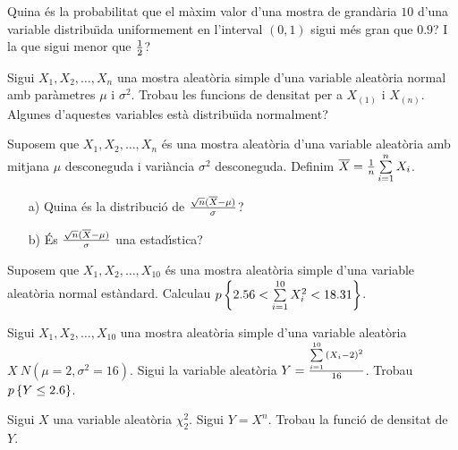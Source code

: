 \begin{prob}
{Quina \'es la probabilitat que el m\`axim valor 
d'una mostra de grand\`aria $10$ d'una variable distribu\"{\i}da uniformement 
en l'interval $(0,1)$
sigui m\'es gran que $0.9$? I la que sigui menor que ${1\over 2}$?}
\end{prob}

\begin{prob}
{Sigui $X_1,X_2,\ldots,X_n$ una mostra aleat\`oria simple d'una
variable aleat\`oria 
normal amb par\`ametres $\mu$ i $\sigma^2$. 
Trobau les funcions de densitat per a $X_{(1)}$ i $X_{(n)}$. 
Algunes d'aquestes variables est\`a distribu\"{\i}da normalment?}
\end{prob}

\begin{prob}
{Suposem que $X_1,X_2,\ldots,X_n$ \'es una mostra aleat\`oria d'una
variable aleat\`oria 
amb mitjana $\mu$ desconeguda i vari\`ancia $\sigma^2$ desconeguda. 
Definim \break $\overline{X}={1\over n}\sum\limits_{i=1}^n X_i$.
\begin{itemize}
\item[a)] {Quina \'es la distribuci\'o de ${\sqrt{n}(\overline{X}-\mu)\over
\sigma}$?}
\item[b)] {\'Es ${\sqrt{n}(\overline{X}-\mu)\over \sigma}$ 
una estad\'{\i}stica?}
\end{itemize}}
\end{prob}

\begin{prob}
{Suposem que $X_1,X_2,\ldots, X_{10}$ \'es una mostra aleat\`oria simple
d'una variable aleat\`oria 
normal est\`andard. Calculau
$p\left\{2.56<\sum\limits_{i=1}^{10} X_i^2 <18.31\right\}$.}
\end{prob}

\begin{prob}
{Sigui $X_1,X_2,\ldots,X_{10}$ una mostra aleat\`oria simple 
d'una variable aleat\`oria
\newline\mbox{$X\ N(\mu=2,\sigma^2=16)$.} 
Sigui la variable aleat\`oria $Y={\sum\limits_{i=1}^{10}{(X_i-2)}^2\over 16}$. 
Trobau\break\mbox{$p\left\{Y\leq
2.6\right\}$.}}
\end{prob}

\begin{prob}
{
Sigui $X$ una variable aleat\`oria $\chi_2^2$. Sigui $Y=X^n$. Trobau la funci\'o
de densitat de $Y$.
}
\end{prob}

